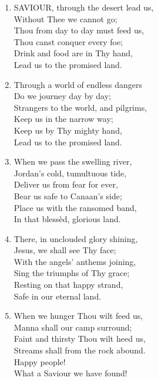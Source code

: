 \begin{enumerate}
    \item SAVIOUR, through the desert lead us, \\
        Without Thee we cannot go; \\
        Thou from day to day must feed us, \\
        Thou canst conquer every foe; \\
        Drink and food are in Thy hand, \\
        Lead us to the promised land.

    \item Through a world of endless dangers \\
        Do we journey day by day; \\
        Strangers to the world, and pilgrims, \\
        Keep us in the narrow way; \\
        Keep us by Thy mighty hand, \\
        Lead us to the promised land.

    \item When we pass the swelling river, \\
        Jordan's cold, tumultuous tide, \\
        Deliver us from fear for ever, \\
        Bear us safe to Canaan's side; \\
        Place us with the ransomed band, \\
        In that bless\`ed, glorious land.

    \item There, in unclouded glory shining, \\
        Jesus, we shall see Thy face; \\
        With the angels' anthems joining, \\
        Sing the triumphs of Thy grace; \\
        Resting on that happy strand, \\
        Safe in our eternal land.

    \item When we hunger Thou wilt feed us, \\
        Manna shall our camp surround; \\
        Faint and thirsty Thou wilt heed us, \\
        Streams shall from the rock abound. \\
        Happy people! \\
        What a Saviour we have found!

\end{enumerate}


